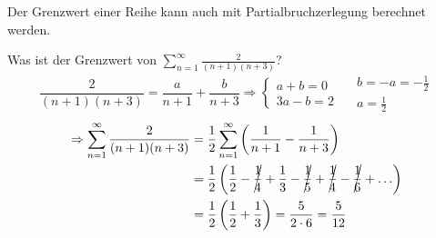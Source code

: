 \noindent Der Grenzwert einer Reihe kann auch mit Partialbruchzerlegung berechnet werden.
\begin{example}
    Was ist der Grenzwert von $\sum_{n=1}^\infty \frac{2}{(n+1)(n+3)}$?
    \tcblower
    \begin{equation*}
        \frac{2}{(n+1)(n+3)} = \frac{a}{n+1} + \frac{b}{n+3} \Rightarrow \begin{cases}
            a + b = 0\\
            3a - b = 2
        \end{cases}
        \quad
        \begin{matrix}
            b = -a = -\frac{1}{2}\\
            a = \frac{1}{2}
        \end{matrix}
    \end{equation*}
    \begin{align*}
        \Rightarrow \sum_{n=1}^\infty \frac{2}{(n+1)(n+3)} &= \frac{1}{2}\sum_{n=1}^\infty\left(\frac{1}{n+1} - \frac{1}{n+3}\right)\\
        & = \frac{1}{2}\left(\frac{1}{2} - \cancel{\frac{1}{4}} + \frac{1}{3} - \cancel{\frac{1}{5}} + \cancel{\frac{1}{4}} - \cancel{\frac{1}{6}} + \ldots\right)\\
        &= \frac{1}{2}\left(\frac{1}{2} + \frac{1}{3}\right) = \frac{5}{2 \cdot 6} = \frac{5}{12}
    \end{align*}
\end{example}